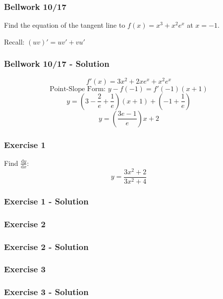 \documentclass[12pt]{beamer}
\begin{document}
\begin{frame}
	\frametitle{Bellwork 10/17}
	\initclock

	\vfill
	\vfill
	\vfill
	\vfill
	\Large
	Find the equation of the tangent line to $f(x)=x^3+x^2e^x$ at $x=-1$.\par
	\vfill
	\vfill
	Recall: $(uv)'=uv'+vu'$
	\vfill
	\vfill
	\vfill
	\vfill
	\vfill

	\small
	\crono
\end{frame}
\begin{frame}
	\frametitle{Bellwork 10/17 - Solution}

	\Large
	\[f'(x) = 3x^2 + 2xe^x + x^2e^x\]
	\vfill
	\[\text{Point-Slope Form: }y-f(-1)=f'(-1)(x+1)\]
	\[y = \left(3-\frac{2}{e}+\frac{1}{e}\right)(x+1)+\left(-1+\frac{1}{e}\right)\]
	\[\boxed{y = \left(\frac{3e-1}{e}\right)x+2}\] %
	\vfill
\end{frame}
\begin{frame}
	\frametitle{Exercise 1}

	\LARGE
	Find $\frac{\mathrm{d}y}{\mathrm{d}x}$: \[y=\frac{3x^2+2}{3x^2+4}\]
\end{frame}
\begin{frame}
	\frametitle{Exercise 1 - Solution}

	
\end{frame}
\begin{frame}
	\frametitle{Exercise 2}

	
\end{frame}
\begin{frame}
	\frametitle{Exercise 2 - Solution}

	
\end{frame}
\begin{frame}
	\frametitle{Exercise 3}

	
\end{frame}
\begin{frame}
	\frametitle{Exercise 3 - Solution}

	
\end{frame}
\end{document}

